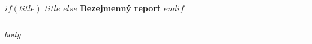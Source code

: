 \documentclass[a4paper]{article}
\begin{document}
\begin{center}
$if(title)$
\textbf{\LARGE $title$}
$else$
\textbf{\LARGE Bezejmenný report}
$endif$
\noindent\hfil\rule{.9\textwidth}{.25pt}\hfil
\end{center}

$body$
\end{document}
